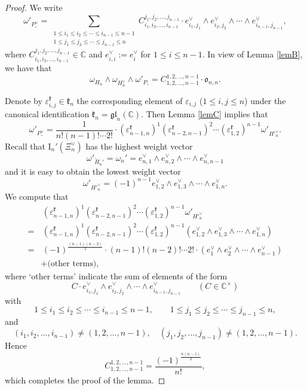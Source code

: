 \documentclass[12pt, a4paper]{amsart}
\newcommand{\RI}{{\mathrm {I}}}
\newcommand{\C}{\mathbb{C}}
\theoremstyle{Theorem}
\theoremstyle{Theorem}
\theoremstyle{Theorem}
\theoremstyle{Theorem}
\theoremstyle{Plain}
\theoremstyle{Definition}
\begin{document}
	\begin{proof}
		We write
		\[
		\omega'_{P_{\circ}^{\vee}}=\sum_{\substack{
				1\leq i_1\leq i_2\leq \cdots\leq i_{n-1}\leq n-1\\
				1\leq j_1\leq j_2\leq\cdots\leq j_{n-1}\leq n
		}} C_{i_1,i_2,\dots,i_{n-1}}^{j_1,j_2,\dots,j_{n-1}}\cdot e^{\vee}_{i_1,j_1}\wedge e^{\vee}_{i_2,j_2}\wedge\cdots\wedge e^{\vee}_{i_{n-1},j_{n-1}},
		\]
		where $C_{i_1,i_2,\dots,i_{n-1}}^{j_1,j_2,\dots,j_{n-1}}\in\C$ and $e_{i,i}^{\vee}:=e_i^{\vee}$ for $1\leq i\leq n-1$. In view of Lemma \ref{lemB}, we have that
		\[
		\omega_{H_n}\wedge\omega_{H_n^{\vee}}\wedge\omega'_{P_{\circ}}=C_{1,2,\dots,n-1}^{1,2,\dots,n-1}\cdot\mathfrak{o}_{n,n}.
		\]
		
		Denote by $\varepsilon_{i,j}^{\mathfrak{k}}\in\mathfrak{k}_n$ the corresponding element of $\varepsilon_{i,j}$ ($1\leq i,j\leq n$) under the canonical identification $\mathfrak{k}_n=\mathfrak{gl}_n(\C)$. Then Lemma \ref{lemC} implies that
		\[
		\omega'_{P_{\circ}^{\vee}}=\frac{1}{n!(n-1)!\cdots 2!}\cdot(\varepsilon^{\mathfrak{k}}_{n-1,n})^1(\varepsilon^{\mathfrak{k}}_{n-2,n-1})^2\cdots(\varepsilon^{\mathfrak{k}}_{1,2})^{n-1}\omega'_{H'^{\vee}_n}.
		\]
		Recall that $\RI_n'(\Xi_n^{\vee})$ has the highest weight vector
		\[
		\omega'_{\check{H}_n'}=\omega_n'=e_{n,1}^{\vee}\wedge e_{n,2}^{\vee}\wedge\cdots\wedge e_{n,n-1}^{\vee}
		\]
		and it is easy to obtain the lowest weight vector
		\[
		\omega'_{H'^{\vee}_n}=(-1)^{n-1}e_{1,2}^{\vee}\wedge e_{1,3}^{\vee}\wedge\cdots\wedge e_{1,n}^{\vee}.
		\]
		We compute that
		\[
		\begin{aligned}
			&\,(\varepsilon^{\mathfrak{k}}_{n-1,n})^1(\varepsilon^{\mathfrak{k}}_{n-2,n-1})^2\cdots(\varepsilon^{\mathfrak{k}}_{1,2})^{n-1}\omega'_{H'^{\vee}_n}\\
			=&\,(\varepsilon^{\mathfrak{k}}_{n-1,n})^1(\varepsilon^{\mathfrak{k}}_{n-2,n-1})^2\cdots(\varepsilon^{\mathfrak{k}}_{1,2})^{n-1}\left(e_{1,2}^{\vee}\wedge e_{1,3}^{\vee}\wedge\cdots\wedge e_{1,n}^{\vee}\right)\\
			=&\,(-1)^{\frac{(n-1)(n-2)}{2}}\cdot(n-1)!(n-2)!\cdots2!\cdot\left(e_{1}^{\vee}\wedge e_{2}^{\vee}\wedge\cdots\wedge e_{n-1}^{\vee}\right)\\
			&+\text{(other terms)},
		\end{aligned}
		\]
		where `other terms' indicate the sum of elements of the form
		\[
		C\cdot e^{\vee}_{i_1,j_1}\wedge e^{\vee}_{i_2,j_2}\wedge\cdots\wedge e^{\vee}_{i_{n-1},j_{n-1}}\qquad (C\in\C^{\times})
		\]
		with
		\[
		1\leq i_1\leq i_2\leq \cdots\leq i_{n-1}\leq n-1,\qquad 1\leq j_1\leq j_2\leq\cdots\leq j_{n-1}\leq n,
		\]
		and
		\[
		\left(i_1,i_2,\dots,i_{n-1}\right)\neq\left(1,2,\dots,n-1\right),\quad\left(j_1,j_2,\dots,j_{n-1}\right)\neq\left(1,2,\dots,n-1\right).
		\]
		Hence
		\[
		C_{1,2,\dots,n-1}^{1,2,\dots,n-1}=\frac{(-1)^{\frac{n(n-1)}{2}}}{n!},
		\]
		which completes the proof of the lemma.
	\end{proof}
	
\end{document}
